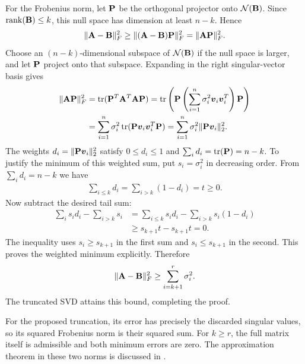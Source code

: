 \documentclass[../main.tex]{subfiles}
\begin{document}
{For the Frobenius norm, let $\mathbf{P}$ be the orthogonal projector onto $\mathcal{N}(\mathbf{B})$. Since $\operatorname{rank}(\mathbf{B})\leq k$, this null space has dimension at least $n-k$. Hence
\begin{align*}
    \|\mathbf{A}-\mathbf{B}\|_F^2
    \geq \|(\mathbf{A}-\mathbf{B})\mathbf{P}\|_F^2
    =\|\mathbf{A}\mathbf{P}\|_F^2.
\end{align*}
Choose an $(n-k)$-dimensional subspace of $\mathcal{N}(\mathbf{B})$ if the null space is larger, and let $\mathbf{P}$ project onto that subspace. Expanding in the right singular-vector basis gives
\begin{align*}
    \|\mathbf{A}\mathbf{P}\|_F^2
    &= \operatorname{tr}(\mathbf{P}^T\mathbf{A}^T\mathbf{A}\mathbf{P})
    = \operatorname{tr}\left( \mathbf{P} \left(\sum_{i=1}^n \sigma_i^2 \boldsymbol{v}_i\boldsymbol{v}_i^T\right) \mathbf{P} \right) \\
    &= \sum_{i=1}^n \sigma_i^2 \operatorname{tr}(\mathbf{P}\boldsymbol{v}_i\boldsymbol{v}_i^T\mathbf{P})
    = \sum_{i=1}^n \sigma_i^2 \|\mathbf{P}\boldsymbol{v}_i\|_2^2.
\end{align*}
The weights $d_i=\|\mathbf{P}\boldsymbol{v}_i\|_2^2$ satisfy $0\leq d_i\leq1$ and $\sum_i d_i=\operatorname{tr}(\mathbf{P})=n-k$. To justify the minimum of this weighted sum, put $s_i=\sigma_i^2$ in decreasing order. From $\sum_i d_i=n-k$ we have
\begin{align*}
 \sum_{i\leq k}d_i=\sum_{i>k}(1-d_i)=t\geq0.
\end{align*}
Now subtract the desired tail sum:
\begin{align*}
 \sum_i s_i d_i-\sum_{i>k}s_i
 &=\sum_{i\leq k}s_i d_i-\sum_{i>k}s_i(1-d_i)\\
 &\geq s_{k+1}t-s_{k+1}t=0.
\end{align*}
The inequality uses $s_i\geq s_{k+1}$ in the first sum and $s_i\leq s_{k+1}$ in the second. This proves the weighted minimum explicitly. Therefore
\begin{align*}
    \|\mathbf{A}-\mathbf{B}\|_F^2\geq\sum_{i=k+1}^r\sigma_i^2.
\end{align*}
The truncated SVD attains this bound, completing the proof.


For the proposed truncation, its error has precisely the discarded singular values, so its squared Frobenius norm is their squared sum. For $k\geq r$, the full matrix itself is admissible and both minimum errors are zero. The approximation theorem in these two norms is discussed in \citet{golubvanloan2013}.
}

\end{document}
